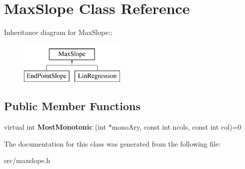 \hypertarget{classMaxSlope}{
\section{MaxSlope Class Reference}
\label{d0/d39/classMaxSlope}
}
Inheritance diagram for MaxSlope::\begin{figure}[H]
\begin{center}
\leavevmode
\includegraphics[height=2cm]{d0/d39/classMaxSlope}
\end{center}
\end{figure}
\subsection*{Public Member Functions}
\begin{DoxyCompactItemize}
\item 
\hypertarget{classMaxSlope_a494b1b1ae073d3b29fe7cdc023ce7861}{
virtual int {\bfseries MostMonotonic} (int $\ast$monoAry, const int ncols, const int col)=0}
\label{d0/d39/classMaxSlope_a494b1b1ae073d3b29fe7cdc023ce7861}

\end{DoxyCompactItemize}


The documentation for this class was generated from the following file:\begin{DoxyCompactItemize}
\item 
src/maxslope.h\end{DoxyCompactItemize}
